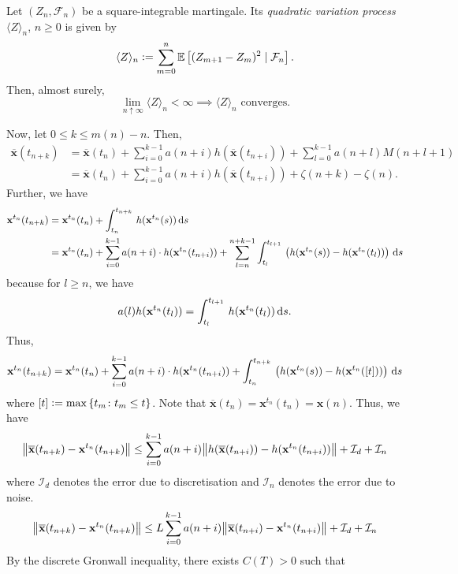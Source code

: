 \begin{thm}
Let $(Z_n, \mathcal{F}_n)$ be a square-integrable martingale. Its \emph{quadratic variation process} $\langle Z \rangle_n$, $n \geq 0$ is given by
\[
    \langle Z \rangle_n \vcentcolon= \sum_{m=0}^n \mathbb{E} \left[ (Z_{m+1} - Z_m)^2 \mid \mathcal{F}_n \right].
\]
Then, almost surely,
\[
    \lim_{n \uparrow \infty} \langle Z \rangle_n < \infty \implies \langle Z \rangle_n \text{ converges}.
\]
\end{thm}

Now, let $0 \leq k \leq m(n) - n$. Then,
\begin{align*}
    \overline{\mathbf{x}}(t_{n+k}) &= \overline{\mathbf{x}}(t_n) + \sum_{i=0}^{k-1} a(n+i) h(\overline{\mathbf{x}}(t_{n+i})) + \sum_{l=0}^{k-1} a(n+l) M(n+l+1) \\
    &= \overline{\mathbf{x}}(t_n) + \sum_{i=0}^{k-1} a(n+i) h(\overline{\mathbf{x}}(t_{n+i})) + \zeta(n+k) - \zeta(n).
\end{align*}
Further, we have
\begin{align*}
    \mathbf{x}^{t_n}(t_{n+k}) &= \mathbf{x}^{t_n}(t_n) + \int_{t_n}^{t_{n+k}} \, h(\mathbf{x}^{t_n}(s)) \, \mathrm{d} s \\
    &= \mathbf{x}^{t_n}(t_n) + \sum_{i=0}^{k-1} a(n+i) \cdot h(\mathbf{x}^{t_n}(t_{n+i})) + \sum_{l=n}^{n+k-1} \int_{t_l}^{t_{l+1}} \, \left( h(\mathbf{x}^{t_n}(s)) -  h(\mathbf{x}^{t_n}(t_l)) \right) \, \mathrm{d} s
\end{align*}
because for $l \geq n$, we have
\[
    a(l) h(\mathbf{x}^{t_n}(t_l)) = \int_{t_l}^{t_{l+1}} \, h(\mathbf{x}^{t_n}(t_l)) \, \mathrm{d} s.
\]
Thus, 
\[
    \mathbf{x}^{t_n}(t_{n+k}) = \mathbf{x}^{t_n}(t_n) + \sum_{i=0}^{k-1} a(n+i) \cdot h(\mathbf{x}^{t_n}(t_{n+i})) +  \int_{t_n}^{t_{n+k}} \, \left( h(\mathbf{x}^{t_n}(s)) -  h(\mathbf{x}^{t_n}([t])) \right) \, \mathrm{d} s
\]
where $[t] \vcentcolon= \max \left\{ t_m \colon t_m \leq t \right\}$. Note that $\overline{\mathbf{x}}(t_n) = \mathbf{x}^{t_n}(t_n) = \mathbf{x}(n)$. Thus, we have
\[
    \norm{\overline{\mathbf{x}}(t_{n+k}) - \mathbf{x}^{t_n}(t_{n+k})} \leq 
     \sum_{i=0}^{k-1} a(n+i) \norm{h(\overline{\mathbf{x}}(t_{n+i})) - h(\mathbf{x}^{t_n}(t_{n+i}))} + \mathcal{I}_d + \mathcal{I}_n
\]
where $\mathcal{I}_d$ denotes the error due to discretisation and $\mathcal{I}_n$ denotes the error due to noise. 
\[
    \norm{\overline{\mathbf{x}}(t_{n+k}) - \mathbf{x}^{t_n}(t_{n+k})} \leq 
     L\sum_{i=0}^{k-1} a(n+i) \norm{\overline{\mathbf{x}}(t_{n+i}) - \mathbf{x}^{t_n}(t_{n+i})} + \mathcal{I}_d + \mathcal{I}_n
\]
By the discrete Gronwall inequality, there exists $C(T) > 0$ such that 
